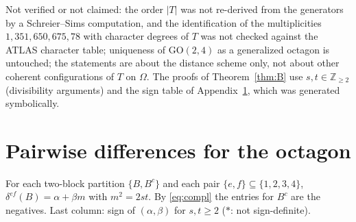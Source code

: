 \documentclass[11pt]{article}
\theoremstyle{remark}
\begin{document}
Not verified or not claimed: the order $|T|$ was not re-derived from the generators by a Schreier--Sims computation, and the identification of the multiplicities $1,351,650,675,78$ with character degrees of $T$ was not checked against the ATLAS character table; uniqueness of $\mathrm{GO}(2,4)$ as a generalized octagon is untouched; the statements are about the distance scheme only, not about other coherent configurations of $T$ on $\Omega$. The proofs of Theorem~\ref{thm:B} use $s,t\in\mathbb Z_{\ge2}$ (divisibility arguments) and the sign table of Appendix~\ref{app:table}, which was generated symbolically.

\appendix
\section{Pairwise differences for the octagon}\label{app:table}
For each two-block partition $\{B,B^c\}$ and each pair $\{e,f\}\subseteq\{1,2,3,4\}$, $\delta^{ef}(B)=\alpha+\beta m$ with $m^2=2st$. By \eqref{eq:compl} the entries for $B^c$ are the negatives. Last column: sign of $(\alpha,\beta)$ for $s,t\ge2$ ($\ast$: not sign-definite).
\end{document}
